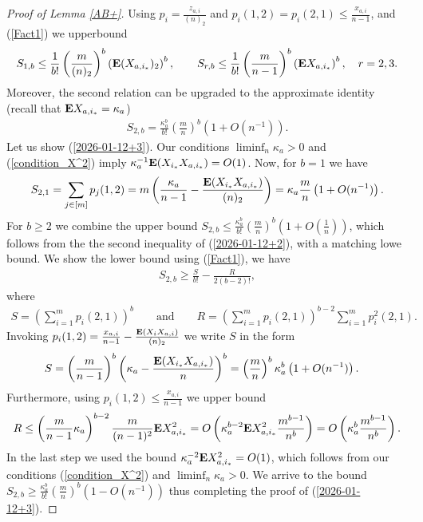 \documentclass[11pt, a4paper]{article}
\newcommand{\E}{{\bf{E}}}
\begin{document}
\begin{proof}[ Proof of Lemma \ref{AB+}]
Using
$p_i=\frac{z_{a,i}}{(n)_2}$ 
and
$p_i(1,2)
=
p_i(2,1)
\le 
\frac{x_{a,i}}{n-1}$, 
and (\ref{Fact1}) we upperbound
\begin{align}
\label{2026-01-12+2}
S_{1,b}
\le 
\frac{1}{b!}
\left(\frac{m}{(n)_2}\right)^b
\left(
\E(X_{a,i_*})_2
\right)^b,
\qquad
S_{r,b}
\le 
\frac{1}{b!}
\left(\frac{m}{n-1}\right)^b
\left(
\E X_{a,i_*}
\right)^b,
\quad
r=2,3.
\end{align}
 Moreover, 
the second relation can be upgraded
to the approximate identity (recall that $\E X_{a,i_*}=\kappa_a$)
\begin{align}
\label{2026-01-12+3}
S_{2,b}
=
 \frac{\kappa_a^b}{b!}\left(\frac{m}{n}\right)^b
 \left(1+O(n^{-1})\right).
\end{align}
Let us show (\ref{2026-01-12+3}). 
Our conditions $\liminf_n\kappa_a>0$ and (\ref{condition_X^2}) imply 
$\kappa_a^{-1}\E(X_{i_*}X_{a,i_*})=O(1)$.
Now, for $b=1$ we have 
\begin{align*}
S_{2,1}
=
\sum_{j\in [m]}p_j(1,2)
=m\left(\frac{\kappa_a}{n-1}-\frac{\E (X_{i_*}X_{a,i_*})}{(n)_2}\right)
=
\kappa_a
\frac{m}{n}
\left(
1
+
O(n^{-1})
\right).
\end{align*}
For $b\ge 2$ 
 we combine 
 the upper bound 
$S_{2,b}
\le
\frac{\kappa_a^b}{b!}
\left(\frac{m}{n}\right)^b
\left(1+O\left(\frac{1}{n}\right)\right)$,
which 
follows from the the second inequality of 
(\ref{2026-01-12+2}), with a matching lowe bound. We show
the
lower bound using 
(\ref{Fact1}), we have
\begin{align*}
S_{2,b}
\ge \frac{S}{b!}-\frac{R}{2(b-2)!},
\end{align*}
where
\begin{align*}
S=\left(
\sum_{i=1}^mp_i(2,1)\right)^b
\qquad
{\text{and}}
\qquad
R=\left(
\sum_{i=1}^mp_i(2,1)\right)^{b-2}
\sum_{i=1}^mp_i^2(2,1).
\end{align*}
Invoking 
$p_i(1,2)= \frac{x_{a,i}}{n-1}-\frac{\E (X_iX_{a,i})}{(n)_2}$
we write $S$ in the form 
\begin{align*}
S
&
=
\left(\frac{m}{n-1}\right)^b
\left(\kappa_a-\frac{\E(X_{i_*}X_{a,i_*})}{n}\right)^b
=
\left(\frac{m}{n}\right)^b
\kappa_a^b 
\left(1+O(n^{-1})\right).
\end{align*}
Furthermore, using  
$p_i(1,2)\le \frac{x_{a,i}}{n-1}$ 
we upper bound
\begin{align*}
R
\le 
\left(\frac{m}{n-1}\kappa_a\right)^{b-2}
\frac{m}{(n-1)^2}\E X^2_{a,i_*}
=
O\left(\kappa_a^{b-2}\E X_{a,i_*}^2
\frac{m^{b-1}}{n^b}\right)
=
O\left(\kappa_a^b
\frac{m^{b-1}}{n^b}\right).
\end{align*}
In the last step we used the bound
$\kappa_a^{-2}\E X_{a,i_*}^2=O(1)$, which follows from 
our conditions
(\ref{condition_X^2})  and
$\liminf_n\kappa_a>0$.
We arrive to the bound 
$S_{2,b}
\ge 
\frac{\kappa_a^b}{b!}
\left(\frac{m}{n}\right)^b
\left(
1
-
O(n^{-1})
\right)$
thus completing the proof of
(\ref{2026-01-12+3}).


\end{proof}
\end{document}
